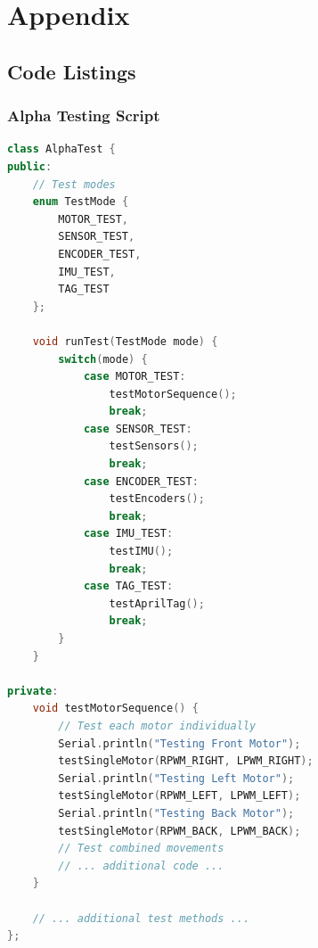 \section{Appendix}

\subsection{Code Listings}

\subsubsection{Alpha Testing Script}
\begin{lstlisting}[language=C++, caption=Alpha Testing Script]
class AlphaTest {
public:
    // Test modes
    enum TestMode {
        MOTOR_TEST,
        SENSOR_TEST,
        ENCODER_TEST,
        IMU_TEST,
        TAG_TEST
    };

    void runTest(TestMode mode) {
        switch(mode) {
            case MOTOR_TEST:
                testMotorSequence();
                break;
            case SENSOR_TEST:
                testSensors();
                break;
            case ENCODER_TEST:
                testEncoders();
                break;
            case IMU_TEST:
                testIMU();
                break;
            case TAG_TEST:
                testAprilTag();
                break;
        }
    }

private:
    void testMotorSequence() {
        // Test each motor individually
        Serial.println("Testing Front Motor");
        testSingleMotor(RPWM_RIGHT, LPWM_RIGHT);
        Serial.println("Testing Left Motor");
        testSingleMotor(RPWM_LEFT, LPWM_LEFT);
        Serial.println("Testing Back Motor");
        testSingleMotor(RPWM_BACK, LPWM_BACK);
        // Test combined movements
        // ... additional code ...
    }
    
    // ... additional test methods ...
};
\end{lstlisting}

